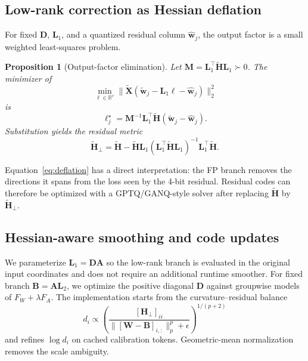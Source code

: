 \documentclass{article}
\newtheorem{proposition}{Proposition}
\newcommand{\X}{\bm{X}}
\newcommand{\W}{\bm{W}}
\newcommand{\Hess}{\bm{H}}
\newcommand{\D}{\bm{D}}
\newcommand{\Lo}{\bm{L}_1}
\newcommand{\Lt}{\bm{L}_2}
\begin{document}
\subsection{Low-rank correction as Hessian deflation}

For fixed $\D$, $\Lo$, and a quantized residual column
$\widehat{\bm w}_j$, the output factor is a small weighted least-squares
problem.

\begin{proposition}[Output-factor elimination]
Let $\bm{M}=\Lo^\top\widetilde{\Hess}\Lo\succ0$. The minimizer of
\[
\min_{\bm\ell\in\mathbb{R}^r}
\|\widetilde{\X}(\widetilde{\bm w}_j-\Lo\bm\ell-
\widehat{\bm w}_j)\|_2^2
\]
is
\begin{equation}
\bm\ell_j^\star=\bm{M}^{-1}\Lo^\top\widetilde{\Hess}
(\widetilde{\bm w}_j-\widehat{\bm w}_j).
\end{equation}
Substitution yields the residual metric
\begin{equation}
\widetilde{\Hess}_{\perp}=
\widetilde{\Hess}-\widetilde{\Hess}\Lo
(\Lo^\top\widetilde{\Hess}\Lo)^{-1}
\Lo^\top\widetilde{\Hess}.
\label{eq:deflation}
\end{equation}
\end{proposition}

Equation~\ref{eq:deflation} has a direct interpretation: the FP branch removes
the directions it spans from the loss seen by the 4-bit residual. Residual
codes can therefore be optimized with a GPTQ/GANQ-style solver after replacing
$\widetilde{\Hess}$ by $\widetilde{\Hess}_{\perp}$.

\subsection{Hessian-aware smoothing and code updates}

We parameterize $\Lo=\D\bm{A}$ so the low-rank branch is evaluated in the
original input coordinates and does not require an additional runtime smoother.
For fixed branch $\bm{B}=\bm{A}\Lt$, we optimize the positive diagonal $\D$
against groupwise models of $F_W+\lambda F_A$. The implementation starts from
the curvature--residual balance
\begin{equation}
d_i\propto
\left(\frac{[\Hess_\perp]_{ii}}
{\|[\W-\bm{B}]_{i,:}\|_p^p+\epsilon}\right)^{1/(p+2)}
\label{eq:d-init}
\end{equation}
and refines $\log d_i$ on cached calibration tokens. Geometric-mean
normalization removes the scale ambiguity.
\end{document}
